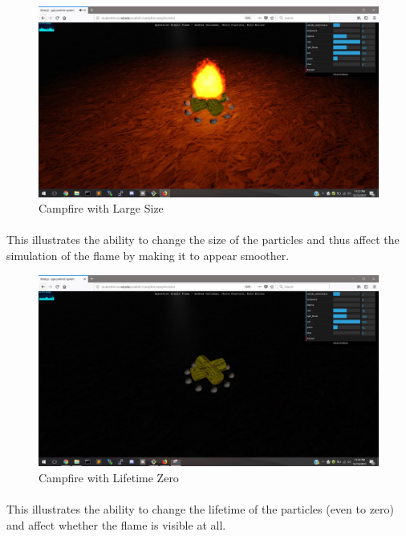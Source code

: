 \documentclass[letterpaper]{article}
\begin{document}
\begin{figure}[H]
\centering
\includegraphics[scale=.35]{result7.JPG}
\caption{Campfire with Large Size}
\label{fig:result7}
\end{figure}
\paragraph{}
This illustrates the ability to change the size of the particles and thus affect the simulation of the flame by making it to appear smoother.

\begin{figure}[H]
\centering
\includegraphics[scale=.35]{result8.JPG}
\caption{Campfire with Lifetime Zero}
\label{fig:result8}
\end{figure}
\paragraph{}
This illustrates the ability to change the lifetime of the particles (even to zero) and affect whether the flame is visible at all.
\end{document}
